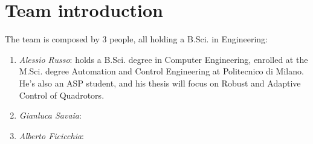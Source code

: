 \chapter*{Team introduction}

The team is composed by 3 people, all holding a B.Sci. in Engineering: 
\begin{enumerate}
\item \emph{Alessio Russo}: holds a B.Sci. degree in Computer Engineering, enrolled at the M.Sci. degree Automation and Control Engineering at Politecnico di Milano. He's also an ASP student, and his thesis will focus on Robust and Adaptive Control of Quadrotors.
\item \emph{Gianluca Savaia}:
\item \emph{Alberto Ficicchia}:
\end{enumerate}